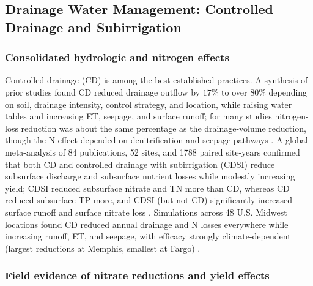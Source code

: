 \subsection{Drainage Water Management: Controlled Drainage and Subirrigation}

\subsubsection{Consolidated hydrologic and nitrogen effects}

Controlled drainage (CD) is among the best-established practices. A
synthesis of prior studies found CD reduced drainage outflow by $17\%$ to
over $80\%$ depending on soil, drainage intensity, control strategy, and
location, while raising water tables and increasing ET, seepage, and
surface runoff; for many studies nitrogen-loss reduction was about the
same percentage as the drainage-volume reduction, though the N effect
depended on denitrification and seepage pathways \parencite{Skaggs2010}. A
global meta-analysis of 84 publications, 52 sites, and 1788 paired
site-years confirmed that both CD and controlled drainage with
subirrigation (CDSI) reduce subsurface discharge and subsurface nutrient
losses while modestly increasing yield; CDSI reduced subsurface nitrate
and TN more than CD, whereas CD reduced subsurface TP more, and CDSI (but
not CD) significantly increased surface runoff and surface nitrate loss
\parencite{Wu2025}. Simulations across 48 U.S. Midwest locations found CD
reduced annual drainage and N losses everywhere while increasing runoff,
ET, and seepage, with efficacy strongly climate-dependent (largest
reductions at Memphis, smallest at Fargo) \parencite{Youssef2018}.

\subsubsection{Field evidence of nitrate reductions and yield effects}

